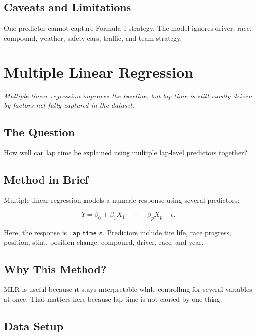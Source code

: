 \documentclass[11pt,oneside,openany]{book}
\newcommand{\chapterquote}[1]{%
\begin{center}
\small\textit{#1}
\end{center}
\vspace{-0.5em}
}
\begin{document}
\section{Caveats and Limitations}

One predictor cannot capture Formula 1 strategy. The model ignores driver, race, compound, weather, safety cars, traffic, and team strategy.


\chapter{Multiple Linear Regression}
\chapterquote{Multiple linear regression improves the baseline, but lap time is still mostly driven by factors not fully captured in the dataset.}

\section{The Question}

How well can lap time be explained using multiple lap-level predictors together?

\section{Method in Brief}

Multiple linear regression models a numeric response using several predictors:

\[
Y = \beta_0 + \beta_1X_1 + \cdots + \beta_pX_p + \epsilon.
\]

Here, the response is \(\texttt{lap\_time\_s}\). Predictors include tire life, race progress, position, stint, position change, compound, driver, race, and year.

\section{Why This Method?}

MLR is useful because it stays interpretable while controlling for several variables at once. That matters here because lap time is not caused by one thing.

\section{Data Setup}
\end{document}
